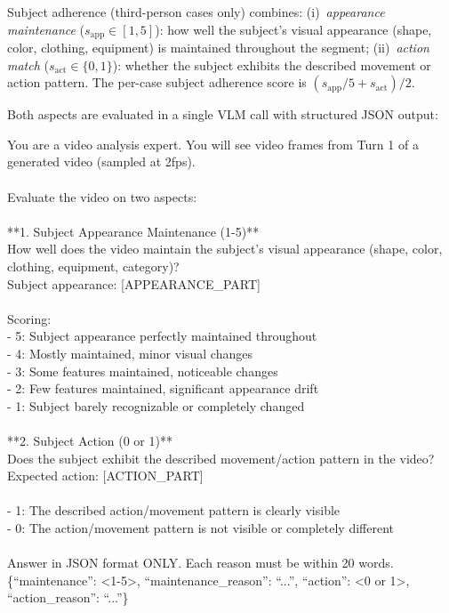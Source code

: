 Subject adherence (third-person cases only) combines:
(i)~\emph{appearance maintenance} ($s_{\mathrm{app}} \in [1,5]$): how well the subject's visual appearance (shape, color, clothing, equipment) is maintained throughout the segment;
(ii)~\emph{action match} ($s_{\mathrm{act}} \in \{0,1\}$): whether the subject exhibits the described movement or action pattern.
The per-case subject adherence score is $(s_{\mathrm{app}}/5 + s_{\mathrm{act}}) / 2$.

Both aspects are evaluated in a single VLM call with structured JSON output:

\begin{tcolorbox}[d2box, title={Subject Adherence Prompt}]
\ttfamily\scriptsize
You are a video analysis expert. You will see video frames from Turn 1 of a generated video (sampled at 2fps).\\
\\
Evaluate the video on two aspects:\\
\\
**1. Subject Appearance Maintenance (1-5)**\\
How well does the video maintain the subject's visual appearance (shape, color, clothing, equipment, category)?\\
Subject appearance: [APPEARANCE\_PART]\\
\\
Scoring:\\
- 5: Subject appearance perfectly maintained throughout\\
- 4: Mostly maintained, minor visual changes\\
- 3: Some features maintained, noticeable changes\\
- 2: Few features maintained, significant appearance drift\\
- 1: Subject barely recognizable or completely changed\\
\\
**2. Subject Action (0 or 1)**\\
Does the subject exhibit the described movement/action pattern in the video?\\
Expected action: [ACTION\_PART]\\
\\
- 1: The described action/movement pattern is clearly visible\\
- 0: The action/movement pattern is not visible or completely different\\
\\
Answer in JSON format ONLY. Each reason must be within 20 words.\\
\{``maintenance'': <1-5>, ``maintenance\_reason'': ``...'', ``action'': <0 or 1>, ``action\_reason'': ``...''\}
\end{tcolorbox}

